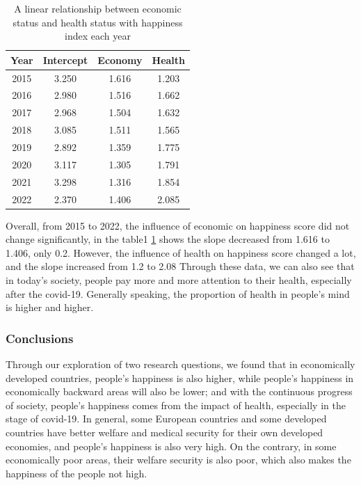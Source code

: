 \documentclass[11pt,a4paper,]{article}
\begin{document}
\begin{table}
\centering
\begin{tabular}{|c|c|c|c|}
\hline
\textbf{Year} & \textbf{Intercept} & \textbf{Economy} & \textbf{Health} \\
\hline
2015          & 3.250              & 1.616            & 1.203           \\
2016          & 2.980              & 1.516            & 1.662           \\
2017          & 2.968              & 1.504            & 1.632           \\
2018          & 3.085              & 1.511            & 1.565           \\
2019          & 2.892              & 1.359            & 1.775           \\
2020          & 3.117              & 1.305            & 1.791           \\
2021          & 3.298              & 1.316            & 1.854           \\
2022          & 2.370              & 1.406            & 2.085           \\
\hline
\end{tabular}
\caption{A linear relationship between economic status and health status with happiness index each year}
\label{tab:table}
\end{table}

Overall, from 2015 to 2022, the influence of economic on happiness score did not change significantly, in the table1 \ref{tab:table} shows the slope decreased from 1.616 to 1.406, only 0.2. However, the influence of health on happiness score changed a lot, and the slope increased from 1.2 to 2.08 Through these data, we can also see that in today's society, people pay more and more attention to their health, especially after the covid-19. Generally speaking, the proportion of health in people's mind is higher and higher.

\hypertarget{conclusions}{%
\subsubsection{Conclusions}\label{conclusions}}

Through our exploration of two research questions, we found that in economically developed countries, people's happiness is also higher, while people's happiness in economically backward areas will also be lower; and with the continuous progress of society, people's happiness comes from the impact of health, especially in the stage of covid-19. In general, some European countries and some developed countries have better welfare and medical security for their own developed economies, and people's happiness is also very high. On the contrary, in some economically poor areas, their welfare security is also poor, which also makes the happiness of the people not high.
\end{document}
